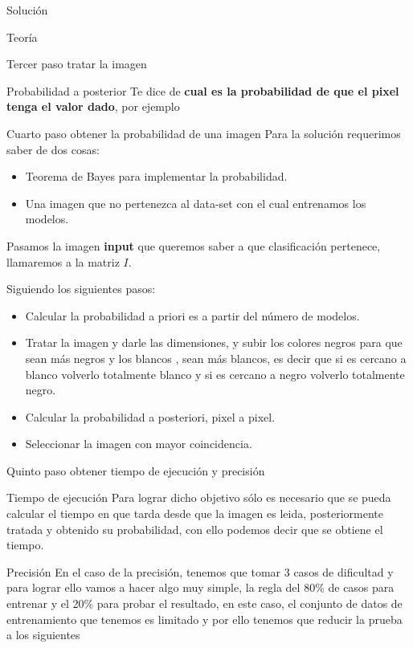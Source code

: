 \documentclass[
  spanish,
  ignorenonframetext,
]{beamer}
\providecommand{\tightlist}{%
  \setlength{\itemsep}{0pt}\setlength{\parskip}{0pt}}
\begin{document}
\begin{frame}[fragile]{Solución}
\begin{block}{Teoría}
\begin{block}{Tercer paso tratar la imagen}
\begin{block}{Probabilidad a posterior}
Te dice de \textbf{cual es la probabilidad de que el pixel tenga el
valor dado}, por ejemplo
\end{block}
\end{block}

\begin{block}{Cuarto paso obtener la probabilidad de una imagen}
\protect\hypertarget{cuarto-paso-obtener-la-probabilidad-de-una-imagen}{}
Para la solución requerimos saber de dos cosas:

\begin{itemize}
\tightlist
\item
  Teorema de Bayes para implementar la probabilidad.
\item
  Una imagen que no pertenezca al data-set con el cual entrenamos los
  modelos.
\end{itemize}

Pasamos la imagen \textbf{input} que queremos saber a que clasificación
pertenece, llamaremos a la matriz \(I\).

Siguiendo los siguientes pasos:

\begin{itemize}
\tightlist
\item
  Calcular la probabilidad a priori es a partir del número de modelos.
\item
  Tratar la imagen y darle las dimensiones, y subir los colores negros
  para que sean más negros y los blancos , sean más blancos, es decir
  que si es cercano a blanco volverlo totalmente blanco y si es cercano
  a negro volverlo totalmente negro.
\item
  Calcular la probabilidad a posteriori, pixel a pixel.
\item
  Seleccionar la imagen con mayor coincidencia.
\end{itemize}

\begin{block}{Quinto paso obtener tiempo de ejecución y precisión}
\protect\hypertarget{quinto-paso-obtener-tiempo-de-ejecuciuxf3n-y-precisiuxf3n}{}
\begin{block}{Tiempo de ejecución}
\protect\hypertarget{tiempo-de-ejecuciuxf3n}{}
Para lograr dicho objetivo sólo es necesario que se pueda calcular el
tiempo en que tarda desde que la imagen es leida, posteriormente tratada
y obtenido su probabilidad, con ello podemos decir que se obtiene el
tiempo.
\end{block}

\begin{block}{Precisión}
\protect\hypertarget{precisiuxf3n}{}
En el caso de la precisión, tenemos que tomar 3 casos de dificultad y
para lograr ello vamos a hacer algo muy simple, la regla del 80\% de
casos para entrenar y el 20\% para probar el resultado, en este caso, el
conjunto de datos de entrenamiento que tenemos es limitado y por ello
tenemos que reducir la prueba a los siguientes


\end{block}
\end{block}
\end{block}
\end{block}
\end{frame}
\end{document}

